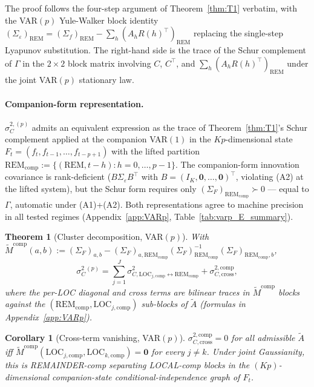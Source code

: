 \documentclass[11pt,letterpaper]{article}
\newtheorem{theorem}{Theorem}
\newtheorem{corollary}{Corollary}
\theoremstyle{remark}
\newcommand{\REM}{\mathrm{REM}}
\newcommand{\LOC}{\mathrm{LOC}}
\newcommand{\Sigmaf}{\Sigma_f}
\newcommand{\Sigmae}{\Sigma_\varepsilon}
\begin{document}
The proof follows the four-step argument of Theorem~\ref{thm:T1} verbatim, with the VAR$(p)$ Yule-Walker block identity $(\Sigmae)_\REM = (\Sigmaf)_\REM - \sum_h (A_h R(h)^\top)_\REM$ replacing the single-step Lyapunov substitution. The right-hand side is the trace of the Schur complement of $\Gamma$ in the $2 \times 2$ block matrix involving $C$, $C^\top$, and $\sum_h (A_h R(h)^\top)_\REM$ under the joint VAR$(p)$ stationary law.

\paragraph{Companion-form representation.} $\sigma^{2,(p)}_C$ admits an equivalent expression as the trace of Theorem~\ref{thm:T1}'s Schur complement applied at the companion VAR$(1)$ in the $Kp$-dimensional state $F_t = (f_t, f_{t-1}, \ldots, f_{t-p+1})$ with the lifted partition $\REM_\text{comp} := \{(\REM, t-h) : h = 0, \ldots, p-1\}$. The companion-form innovation covariance is rank-deficient ($B \Sigmae B^\top$ with $B = (I_K, \mathbf{0}, \ldots, \mathbf{0})^\top$, violating (A2) at the lifted system), but the Schur form requires only $(\Sigma_F)_{\REM_\text{comp}} \succ 0$ --- equal to $\Gamma$, automatic under (A1)+(A2). Both representations agree to machine precision in all tested regimes (Appendix~\ref{app:VARp}, Table~\ref{tab:varp_E_summary}).

\begin{theorem}[Cluster decomposition, VAR$(p)$]\label{thm:T2p}
With $\widetilde M^\text{comp}(a, b) := (\Sigma_F)_{a,b} - (\Sigma_F)_{a, \REM_\text{comp}} (\Sigma_F)_{\REM_\text{comp}}^{-1} (\Sigma_F)_{\REM_\text{comp}, b}$,
\begin{equation}\label{eq:T2p}
\sigma^2_C{}^{(p)} = \sum_{j=1}^{J} \sigma^2_{C, \LOC_{j,\text{comp}} \leftrightarrow \REM_\text{comp}} + \sigma^{2,\text{comp}}_{C, \mathrm{cross}},
\end{equation}
where the per-LOC diagonal and cross terms are bilinear traces in $\widetilde M^\text{comp}$ blocks against the $(\REM_\text{comp}, \LOC_{j,\text{comp}})$ sub-blocks of $\widetilde A$ (formulas in Appendix~\ref{app:VARp}).
\end{theorem}

\begin{corollary}[Cross-term vanishing, VAR$(p)$]\label{cor:cond-indep-p}
$\sigma^{2,\text{comp}}_{C, \mathrm{cross}} = 0$ for all admissible $\widetilde A$ iff $\widetilde M^\text{comp}(\LOC_{j,\text{comp}}, \LOC_{k,\text{comp}}) = \mathbf{0}$ for every $j \ne k$. Under joint Gaussianity, this is REMAINDER-comp separating LOCAL-comp blocks in the $(Kp)$-dimensional companion-state conditional-independence graph of $F_t$.
\end{corollary}
\end{document}

